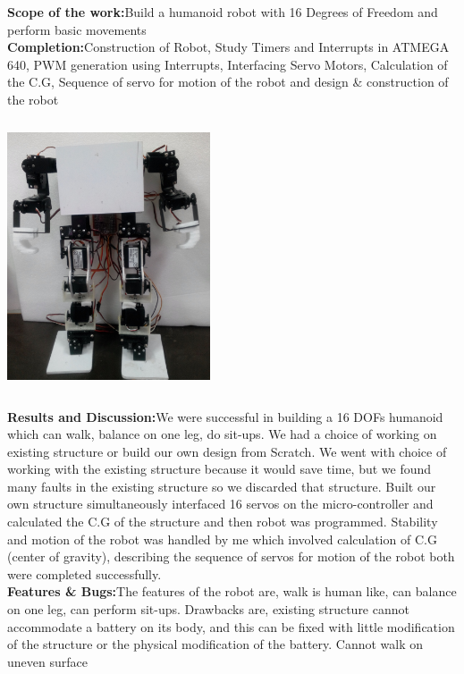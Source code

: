 \documentclass{article}
\begin{document}
\hspace{-5mm}\textbf{Scope of the work:}Build a humanoid robot with 16 Degrees of Freedom and perform basic movements\\ 

\hspace{-5mm}\textbf{Completion:}Construction of Robot, Study Timers and Interrupts in ATMEGA 640, PWM generation using Interrupts, Interfacing Servo Motors, Calculation of the C.G, Sequence of servo for motion of the robot and design \& construction of the robot \\
\begin{center}
\includegraphics[width=6cm, height=8cm]{body_assembly}
\end{center}
\hspace{-5mm}\textbf{Results and Discussion:}We were successful in building a 16 DOFs humanoid which can walk, balance on one leg, do sit-ups. We had a choice of working on existing structure or build our own design from Scratch. We went with choice of working with the existing structure because it would save time, but we found many faults in the existing structure so we discarded that structure. Built our own structure simultaneously interfaced 16 servos on the micro-controller and calculated the C.G of the structure and then robot was programmed. Stability and motion of the robot was handled by me which involved calculation of C.G (center of gravity), describing the sequence of servos for motion of the robot both were completed successfully.          \\

\hspace{-5mm}\textbf{Features \& Bugs:}The features of the robot are, walk is human like, can balance on one leg, can perform sit-ups. Drawbacks are, existing structure cannot accommodate a battery on its body, and this can be fixed with little modification of the structure or the physical modification of the battery. Cannot walk on uneven surface  \\
\end{document}
